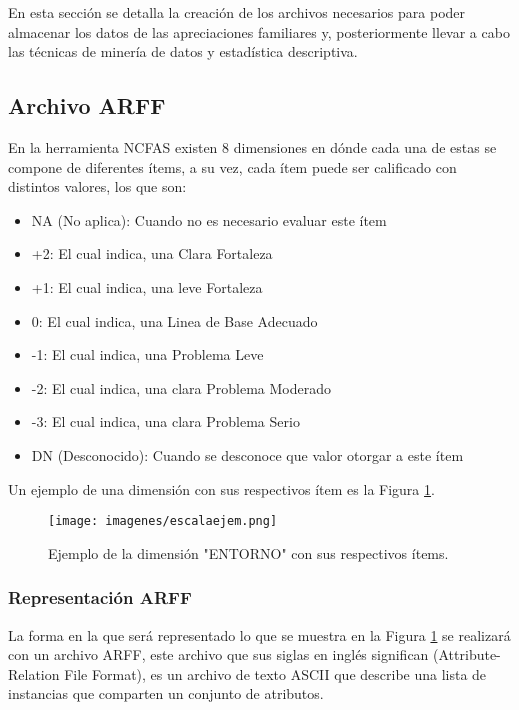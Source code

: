 En esta sección se detalla la creación de los archivos necesarios para poder almacenar los datos de las apreciaciones familiares y, posteriormente llevar a cabo las técnicas de minería de datos y estadística descriptiva. 

\subsection{Archivo ARFF}

En la herramienta NCFAS existen 8 dimensiones en dónde cada una de estas se compone de diferentes ítems, a su vez, cada ítem puede ser calificado con distintos valores, los que son:

\begin{itemize}
	\item NA (No aplica): Cuando no es necesario evaluar este ítem
	\item +2: El cual indica, una Clara Fortaleza 
	\item +1: El cual indica, una leve Fortaleza
	\item 0: El cual indica, una Linea de Base Adecuado
	\item -1: El cual indica, una Problema Leve
	\item -2: El cual indica, una clara Problema Moderado
	\item -3: El cual indica, una clara Problema Serio
	\item DN (Desconocido): Cuando se desconoce que valor otorgar a este ítem
\end{itemize}

Un ejemplo de una dimensión con sus respectivos ítem es la Figura \ref{escalaejem}.\\

\begin{figure}[h!]
	\label{escalaejem}
	\begin{center}
		\texttt{[image: imagenes/escalaejem.png]}
	\end{center}
	\caption{Ejemplo de la dimensión "ENTORNO" con sus respectivos ítems.}
\end{figure}

\subsubsection{Representación ARFF}

La forma en la que será representado lo que se muestra en la Figura \ref{escalaejem} se realizará con un archivo ARFF, este archivo que sus siglas en inglés significan (Attribute-Relation File Format), es un archivo de texto ASCII que describe una lista de instancias que comparten un conjunto de atributos.\\

